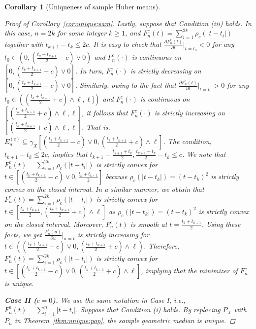 \documentclass[preprint]{imsart}
\theoremstyle{plain}
\newtheorem{corollary}{Corollary}
\theoremstyle{remark}
\begin{document}
\begin{appendix}
\begin{corollary}[Uniqueness of sample Huber means]
\begin{proof}[Proof of Corollary~\ref{cor:unique:sam}]
Lastly, suppose that Condition (iii) holds. In this case, $n = 2k$ for some integer $k \ge 1$, and $F^{c}_{n}(t)=\sum_{i=1}^{2k} \rho_{c}(|t-t_i|)$ together with $t_{k+1} - t_{k} \le 2c$. It is easy to check that $\frac{\partial F^{c}_{n}(t)}{\partial t}|_{t = t_0} < 0$ for any $t_0 \in (0, (\frac{t_{k} + t_{k+1}}{2} - c)\vee 0)$ and $F^{c}_{n}(\cdot)$ is continuous on $[0, (\frac{t_{k} + t_{k+1}}{2}-c) \vee 0]$. In turn, $F^{c}_{n}(\cdot)$ is strictly decreasing on $[0, (\frac{t_{k} + t_{k+1}}{2}-c)\vee 0]$. Similarly, owing to the fact that $\frac{\partial F^{c}_{n}(t)}{\partial t}|_{t=t_0} > 0$ for any $t_0 \in ((\frac{t_{k} + t_{k+1}}{2} + c)\wedge \ell, \ell])$ and $F^{c}_{n}(\cdot)$ is continuous on $[(\frac{t_{k} + t_{k+1}}{2} + c)\wedge \ell, \ell]$, it follows that $F^{c}_{n}(\cdot)$ is strictly increasing on $[(\frac{t_{k} + t_{k+1}}{2} + c)\wedge \ell, \ell]$. That is, $E^{(c)}_{n} \subseteq \gamma_{X}[(\frac{t_{k} + t_{k+1}}{2} - c) \vee 0 , (\frac{t_{k} + t_{k+1}}{2} + c) \wedge \ell]$. The condition, $t_{k+1} -t_{k} \le 2c$, implies that $t_{k+1} - \frac{t_{k+1} + t_{k}}{2}, \frac{t_{k+1} + t_{k}}{2} - t_{k} \le c$. We note that $F^{c}_{n}(t)=\sum_{i=1}^{2k} \rho_{c}(|t-t_i|)$ is strictly convex for $t \in [(\frac{t_{k} + t_{k+1}}{2} - c) \vee 0, \frac{t_{k} + t_{k+1}}{2}]$ because $\rho_{c}(|t- t_{k}|) = (t- t_{k})^2$ is strictly convex on the closed interval. In a similar manner, we obtain that $F^{c}_{n}(t)=\sum_{i=1}^{2k} \rho_{c}(|t-t_i|)$ is strictly convex for $t \in [\frac{t_{k} + t_{k+1}}{2}, (\frac{t_{k} + t_{k+1}}{2} + c) \wedge \ell]$ as $\rho_{c}(|t- t_{k}|) = (t- t_{k})^2$ is strictly convex on the closed interval. Moreover, $F^{c}_{n}(t)$ is smooth at $t = \frac{t_{k} + t_{k+1}}{2}$. Using these facts, we get $\frac{F^{c}_{n}(u)}{\partial u}|_{u=t}$ is strictly increasing for $t \in ((\frac{t_{k} + t_{k+1}}{2} - c) \vee 0, (\frac{t_{k} + t_{k+1}}{2} + c) \wedge \ell)$. Therefore, $F^{c}_{n}(t)=\sum_{i=1}^{2k} \rho_{c}(|t-t_i|)$ is strictly convex for $t \in [(\frac{t_{k} + t_{k+1}}{2} - c) \vee 0, (\frac{t_{k} + t_{k+1}}{2} + c) \wedge \ell]$, implying that the minimizer of $F^{c}_{n}$ is unique.  


\textbf{Case II ($c=0$).} We use the same notation in Case I, i.e., $F^{0}_{n}(t) = \sum_{i=1}^{n} |t-t_i|$. Suppose that Condition (i) holds. By replacing $P_{X}$ with $P_{n}$ in Theorem~\ref{thm:unique:pop}, the sample geometric median is unique. 


\end{proof}
\end{corollary}
\end{appendix}
\end{document}
